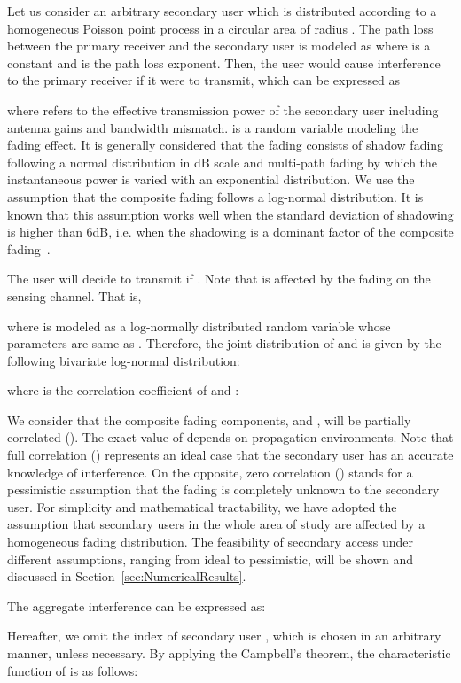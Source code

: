 \documentclass[12pt,submission,journal,onecolumn]{IEEEtran}
\begin{document}
Let us consider an arbitrary secondary user  which is distributed according to a homogeneous Poisson point process in a circular area of radius . The path loss between the primary receiver and the secondary user  is modeled as  where  is a constant and  is the path loss exponent. Then, the user  would cause interference  to the primary receiver if it were to transmit, which can be expressed as

where  refers to the effective transmission power of the secondary user including antenna gains and bandwidth mismatch.  is a random variable modeling the fading effect. It is generally considered that the fading consists of shadow fading following a normal distribution in dB scale and multi-path fading by which the instantaneous power is varied with an exponential distribution. We use the assumption that the composite fading  follows a log-normal distribution. It is known that this assumption works well when the standard deviation of shadowing is higher than 6dB, i.e. when the shadowing is a dominant factor of the composite fading~\cite{507537}.

The user  will decide to transmit if . Note that  is affected by the fading on the sensing channel. That is,

where  is modeled as a log-normally distributed random variable whose parameters are same as . Therefore, the joint distribution of  and  is given by the following bivariate log-normal distribution:

where  is the correlation coefficient of  and :


We consider that the composite fading components,  and , will be partially correlated (). The exact value of  depends on propagation environments. Note that full correlation () represents an ideal case that the secondary user has an accurate knowledge of interference. On the opposite, zero correlation () stands for a pessimistic assumption that the fading is completely unknown to the secondary user. For simplicity and mathematical tractability, we have adopted the assumption that secondary users in the whole area of study are affected by a homogeneous fading distribution. The feasibility of secondary access under different assumptions, ranging from ideal to pessimistic, will be shown and discussed in Section~\ref{sec:NumericalResults}.

The aggregate interference  can be expressed as:

Hereafter, we omit the index of secondary user , which is chosen in an arbitrary manner, unless necessary. By applying the Campbell's theorem, the characteristic function of  is as follows:
\end{document}
